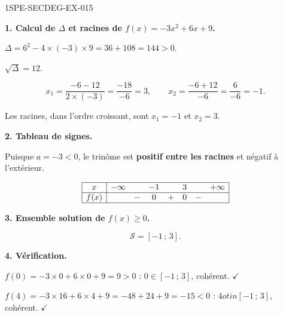 \begin{corrige}{1SPE-SECDEG-EX-015}

\textbf{1. Calcul de $\Delta$ et racines de $f(x) = -3x^2 + 6x + 9$.}


$\Delta = 6^2 - 4 \times (-3) \times 9 = 36 + 108 = 144 > 0$.

$\sqrt{\Delta} = 12$.

\[x_1 = \frac{-6 - 12}{2 \times (-3)} = \frac{-18}{-6} = 3, \qquad x_2 = \frac{-6 + 12}{-6} = \frac{6}{-6} = -1.\]

Les racines, dans l'ordre croissant, sont $x_1 = -1$ et $x_2 = 3$.

\medskip
\textbf{2. Tableau de signes.}


Puisque $a = -3 < 0$, le trinôme est \textbf{positif entre les racines} et négatif à l'extérieur.

\[
\begin{array}{|c|ccccccc|}
\hline
x & -\infty & & -1 & & 3 & & +\infty \\
\hline
f(x) & & - & 0 & + & 0 & - & \\
\hline
\end{array}
\]

\medskip
\textbf{3. Ensemble solution de $f(x) \geqslant 0$.}

\[\boxed{\mathcal{S} = \left[-1\,;\,3\right].}\]

\medskip
\textbf{4. Vérification.}

$f(0) = -3 \times 0 + 6 \times 0 + 9 = 9 > 0$ : $0 \in [-1\,;\,3]$, cohérent. \hfill $\checkmark$

$f(4) = -3 \times 16 + 6 \times 4 + 9 = -48 + 24 + 9 = -15 < 0$ : $4 
otin [-1\,;\,3]$, cohérent. \hfill $\checkmark$

\end{corrige}
